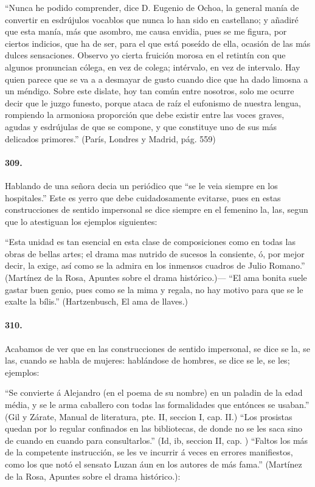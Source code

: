 \documentclass{book}
\begin{document}
``Nunca he podido comprender, dice D. Eugenio de Ochoa, la general manía de convertir en esdrújulos vocablos que nunca lo han sido en castellano; y añadiré que esta manía, más que asombro, me causa envidia, pues se me figura, por ciertos indicios, que ha de ser, para el que está poseído de ella, ocasión de las más dulces sensaciones. Observo yo cierta fruición morosa en el retintín con que algunos pronuncian cólega, en vez de colega; intérvalo, en vez de intervalo. Hay quien parece que se va a a desmayar de gusto cuando dice que ha dado limosna a un méndigo. Sobre este dislate, hoy tan común entre nosotros, solo me ocurre decir que le juzgo funesto, porque ataca de raíz el eufonismo de nuestra lengua, rompiendo la armoniosa proporción que debe existir entre las voces graves, agudas y esdrújulas de que se compone, y que constituye uno de sus más delicados primores.'' (París, Londres y Madrid, pág. 559)


\paragraph{309.} Hablando de una señora decia un periódico que “se le veia siempre en los hospitales.” Este es yerro que debe cuidadosamente evitarse, pues en estas construcciones de sentido impersonal se dice siempre en el femenino la, las, segun que lo atestiguan los ejemplos siguientes:

``Esta unidad es tan esencial en esta clase de composiciones como en todas las obras de bellas artes; el drama mas nutrido de sucesos la consiente, ó, por mejor decir, la exige, así como se la admira en los inmensos cuadros de Julio Romano.'' (Martínez de la Rosa, Apuntes sobre el drama histórico.)--- ``El  ama bonita suele gastar buen genio, pues como se la mima y regala, no hay motivo para que se le exalte la bílis.'' (Hartzenbusch, El ama de llaves.)

\paragraph{310.} Acabamos de ver que en las construcciones de sentido impersonal, se dice se la, se las, cuando se habla de mujeres: hablándose de hombres, se dice se le, se les; ejemplos:

“Se convierte á Alejandro (en el poema de su nombre) en un paladin de la edad média, y se le arma caballero con todas las formalidades que entónces se usaban.” (Gil y Zárate, Manual de literatura, pte. II, seccion I, cap. II.) “Los prosistas quedan por lo regular confinados en las bibliotecas, de donde no se les saca sino de cuando en cuando para consultarlos.” (Id, ib, seccion II, cap. ) “Faltos los más de la competente instrucción, se les ve incurrir á veces en errores manifiestos, como los que notó el sensato Luzan áun en los autores de más fama.” (Martínez de la Rosa, Apuntes sobre el drama histórico.): 
\end{document}
